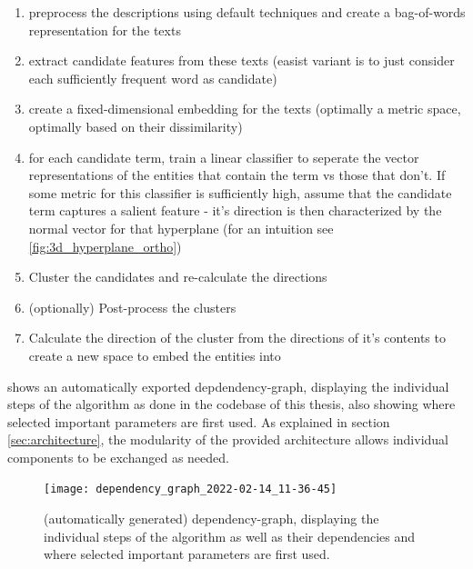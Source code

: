 \begin{enumerate}
	\item preprocess the descriptions using default techniques and create a bag-of-words representation for the texts
	\item extract candidate features from these texts (easist variant is to just consider each sufficiently frequent word as candidate)
	\item create a fixed-dimensional embedding for the texts (optimally a metric space, optimally based on their dissimilarity)
	\item for each candidate term, train a linear classifier to seperate the vector representations of the entities that contain the term vs those that don't. If some metric for this classifier is sufficiently high, assume that the candidate term captures a salient feature - it's direction is then characterized by the normal vector for that hyperplane (for an intuition see \ref{fig:3d_hyperplane_ortho})
	\item Cluster the candidates and re-calculate the directions
	\item (optionally) Post-process the clusters 
	\item Calculate the direction of the cluster from the directions of it's contents to create a new space to embed the entities into
\end{enumerate}


 shows an automatically exported depdendency-graph, displaying the individual steps of the algorithm as done in the codebase of this thesis, also showing where selected important parameters are first used. As explained in section \ref{sec:architecture}, the modularity of the provided architecture allows individual components to be exchanged as needed.


\begin{figure}[htp]
	\begin{center}
	  \texttt{[image: dependency\_graph\_2022-02-14\_11-36-45]}
	  \caption[Dependency-Graph of the Algorithm]{(automatically generated) dependency-graph, displaying the individual steps of the algorithm as well as their dependencies and where selected important parameters are first used.}
	  \label{fig:depdendency_graph}
	\end{center}
\end{figure}


